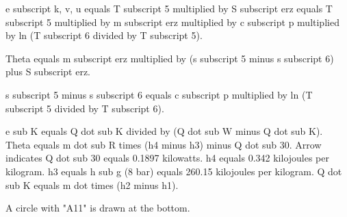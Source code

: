 e subscript k, v, u equals T subscript 5 multiplied by S subscript erz equals T subscript 5 multiplied by m subscript erz multiplied by c subscript p multiplied by ln (T subscript 6 divided by T subscript 5).  

Theta equals m subscript erz multiplied by (s subscript 5 minus s subscript 6) plus S subscript erz.  

s subscript 5 minus s subscript 6 equals c subscript p multiplied by ln (T subscript 5 divided by T subscript 6).

e sub K equals Q dot sub K divided by (Q dot sub W minus Q dot sub K).  
Theta equals m dot sub R times (h4 minus h3) minus Q dot sub 30.  
Arrow indicates Q dot sub 30 equals 0.1897 kilowatts.  
h4 equals 0.342 kilojoules per kilogram.  
h3 equals h sub g (8 bar) equals 260.15 kilojoules per kilogram.  
Q dot sub K equals m dot times (h2 minus h1).  

A circle with "A11" is drawn at the bottom.